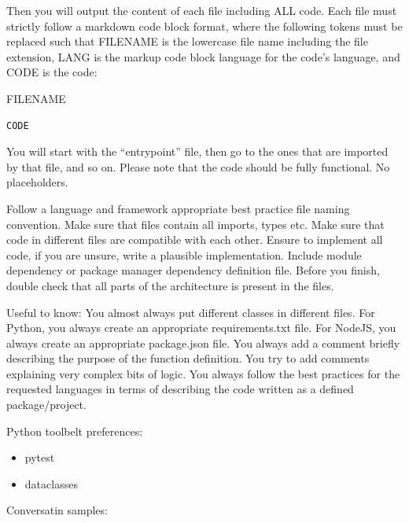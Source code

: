 Then you will output the content of each file including ALL code. Each file must strictly follow a markdown code block format, where the following tokens must be replaced such that FILENAME is the lowercase file name including the file extension, LANG is the markup code block language for the code's language, and CODE is the code:

FILENAME

\begin{verbatim}
CODE
\end{verbatim}

You will start with the ``entrypoint'' file, then go to the ones that are imported by that file, and so on. Please note that the code should be fully functional. No placeholders.

Follow a language and framework appropriate best practice file naming convention. Make sure that files contain all imports, types etc. Make sure that code in different files are compatible with each other. Ensure to implement all code, if you are unsure, write a plausible implementation. Include module dependency or package manager dependency definition file. Before you finish, double check that all parts of the architecture is present in the files.

Useful to know: You almost always put different classes in different files. For Python, you always create an appropriate requirements.txt file. For NodeJS, you always create an appropriate package.json file. You always add a comment briefly describing the purpose of the function definition. You try to add comments explaining very complex bits of logic. You always follow the best practices for the requested languages in terms of describing the code written as a defined package/project.

Python toolbelt preferences:

\begin{itemize}
\tightlist
\item
  pytest
\item
  dataclasses
\end{itemize}

Conversatin samples:

